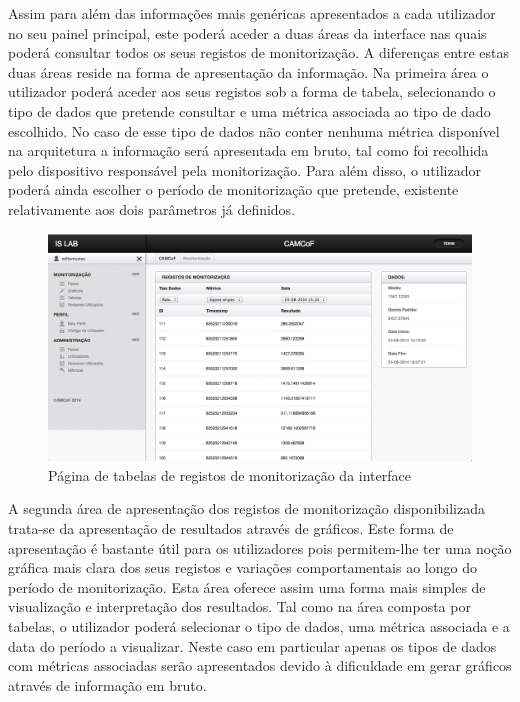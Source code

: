 Assim para além das informações mais genéricas apresentados a cada utilizador no seu painel principal, este poderá aceder a duas áreas da interface nas quais poderá consultar todos os seus registos de monitorização. A diferenças entre estas duas áreas reside na forma de apresentação da informação. Na primeira área o utilizador poderá aceder aos seus registos sob a forma de tabela, selecionando o tipo de dados que pretende consultar e uma métrica associada ao tipo de dado escolhido. No caso de esse tipo de dados não conter nenhuma métrica disponível na arquitetura a informação será apresentada em bruto, tal como foi recolhida pelo dispositivo responsável pela monitorização. Para além disso, o utilizador poderá ainda escolher o período de monitorização que pretende, existente relativamente aos dois parâmetros já definidos.

 \begin{figure}[htb]
   \centering
   \includegraphics[scale=0.29]{Images/tables.png}
   \caption{Página de tabelas de registos de monitorização da interface}
\end{figure}

A segunda área de apresentação dos registos de monitorização disponibilizada trata-se da apresentação de resultados através de gráficos. Este forma de apresentação é bastante útil para os utilizadores pois permitem-lhe ter uma noção gráfica mais clara dos seus registos e variações comportamentais ao longo do período de monitorização. Esta área oferece assim uma forma mais simples de visualização e interpretação dos resultados. Tal como na área composta por tabelas, o utilizador poderá selecionar o tipo de dados, uma métrica associada e a data do período a visualizar. Neste caso em particular apenas os tipos de dados com métricas associadas serão apresentados devido à dificuldade em gerar gráficos através de informação em bruto.

